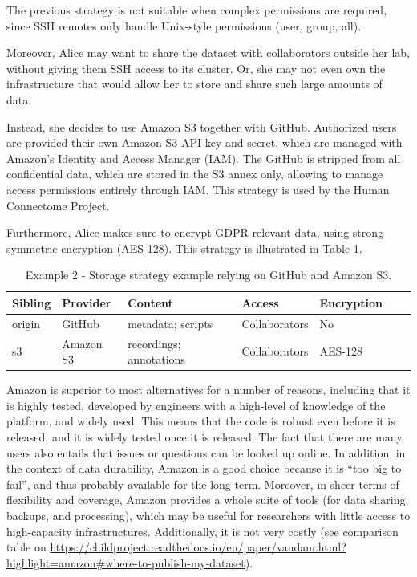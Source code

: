 \documentclass[smallextended]{svjour3}       %
\makeatletter
\newcommand\footnoteref[1]{\protected@xdef\@thefnmark{\ref{#1}}\@footnotemark}
\makeatother
\begin{document}
The previous strategy is not suitable when complex permissions are required, since SSH remotes only handle Unix-style permissions (user, group, all).

Moreover, Alice may want to share the dataset with collaborators outside her lab, without giving them SSH access to its cluster. Or, she may not even own the infrastructure that would allow her to store and share such large amounts of data. 

Instead, she decides to use Amazon S3 together with GitHub. Authorized users are provided their own Amazon S3 API key and secret, which are managed with Amazon's Identity and Access Manager (IAM). The GitHub is stripped from all confidential data, which are stored in the S3 annex only, allowing to manage access permissions entirely through IAM. This strategy is used by the Human Connectome Project\footnoteref{note:hcp}.

Furthermore, Alice makes sure to encrypt GDPR relevant data, using strong symmetric encryption (AES-128). This strategy is illustrated in Table \ref{table:storage2}.

\begin{table}[!htbp]
\centering
\begin{tabular}{@{}lllllll@{}}
\toprule
\textbf{Sibling} & \textbf{Provider} & \textbf{Content} & \textbf{Access} & \textbf{Encryption} \\ \midrule
origin   & GitHub     & metadata; scripts & Collaborators & No  \\
s3 & Amazon S3  &  recordings; annotations  & Collaborators  & AES-128 \\ \bottomrule
\end{tabular}
\caption{\label{table:storage2}Example 2 - Storage strategy example relying on GitHub and Amazon S3.}
\end{table}

Amazon is superior to most alternatives for a number of reasons, including that it is highly tested, developed by engineers with a high-level of knowledge of the platform, and widely used. This means that the code is robust even before it is released, and it is widely tested once it is released. The fact that there are many users also entails that issues or questions can be looked up online. In addition, in the context of data durability, Amazon is a good choice because it is ``too big to fail'', and thus probably available for the long-term. Moreover, in sheer terms of flexibility and coverage, Amazon provides a whole suite of tools (for data sharing, backups, and processing), which may be useful for researchers with little access to high-capacity infrastructures. Additionally, it is not very costly (see comparison table on \url{https://childproject.readthedocs.io/en/paper/vandam.html?highlight=amazon#where-to-publish-my-dataset}).
\end{document}
